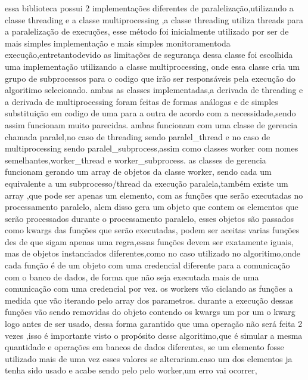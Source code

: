 \documentclass[
	12pt,				%
	openright,			%
	oneside,			%
	a4paper,			%
	english,			%
	french,				%
	spanish,			%
	brazil,				%
	]{abntex2}
\begin{document}
essa biblioteca possui 2 implementações diferentes de paralelização,utilizando a classe threading \cite{threading} e a classe multiprocessing \cite{multiprocessing},a classe threading utiliza threads para a paralelização de execuções,
esse método foi inicialmente utilizado por ser de mais simples implementação e mais simples monitoramentoda execução,entretantodevido as limitações de segurança dessa classe foi escolhida uma implementação utilizando a classe multiprocessing,
onde essa classe cria um grupo de subprocessos para o codigo que irão ser responsáveis pela execução do algoritimo selecionado.
ambas as classes implementadas,a derivada de threading e a derivada de multiprocessing foram feitas de formas análogas e de simples substituição em codigo de uma para a outra de acordo com a necessidade,sendo assim funcionam muito parecidas.
ambas funcionam com uma classe de gerencia chamada paralel,no caso de threading sendo paralel_thread e no caso de multiprocessing sendo paralel_subprocess,assim como classes worker com nomes semelhantes,worker_thread e worker_subprocess.
as classes de gerencia funcionam gerando um array de objetos da classe worker,
sendo cada um equivalente a um subprocesso/thread da execução paralela,também existe um array ,que pode ser apenas um elemento,
com as funções que serão executadas no processamento paralelo,
alem disso gera um objeto que contem os elementos que serão processados durante o processamento paralelo,
esses objetos são passados como kwargs das funções que serão executadas,
podem ser aceitas varias funções des de que sigam apenas uma regra,essas funções devem ser exatamente iguais,
mas de objetos instanciados diferentes,como no caso utilizado no algoritimo,onde cada função é de um objeto com uma credencial diferente para a comunicação com o banco de dados,
de forma que não seja executada mais de uma comunicação com uma credencial por vez.
os workers vão ciclando as funções a medida que vão iterando pelo array dos parametros.
durante a execução dessas funções vão sendo removidas do objeto contendo os kwargs um por um o kwarg logo antes de ser usado,
dessa forma garantido que uma operação não será feita 2 vezes ,isso é importante visto o propósito desse algoritimo,que é simular a mesma quantidade e operações em bancos de dados diferentes,
se um elemento fosse utilizado mais de uma vez esses valores se alterariam.caso um dos elementos ja tenha sido usado e acabe sendo pelo pelo worker,um erro vai ocorrer,
\end{document}
